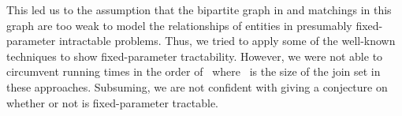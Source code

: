 This led us to the assumption that the bipartite graph in \pCBMs{} and matchings in this graph are too weak to model the relationships of entities in presumably fixed-parameter intractable problems. Thus, we tried to apply some of the well-known techniques to show fixed-parameter tractability. However, we were not able to circumvent running times in the order of~ where~ is the size of the join set in these approaches. Subsuming, we are not confident with giving a conjecture on whether or not \pCBMs{} is fixed-parameter tractable. 








